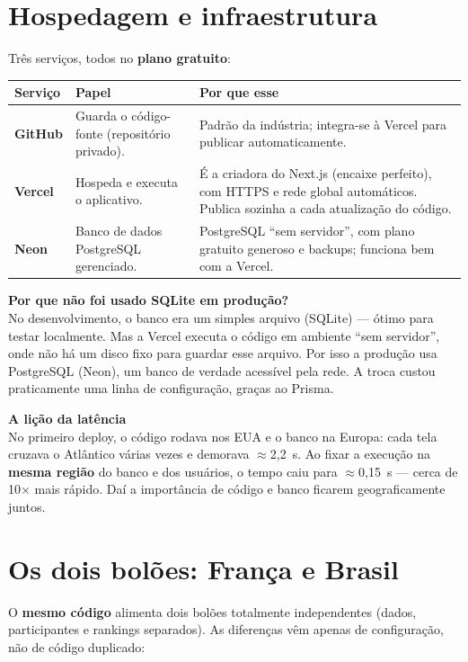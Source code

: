 \documentclass[11pt,a4paper]{article}
\newcommand{\caixa}[2]{%
  \par\medskip\noindent
  \colorbox{verdeclaro}{\begin{minipage}{\dimexpr\linewidth-2\fboxsep}
  \textbf{\color{verde}#1}\\[0.3em]#2
  \end{minipage}}\par\medskip}
\begin{document}
\section{Hospedagem e infraestrutura}\label{sec:hosting}

Três serviços, todos no \textbf{plano gratuito}:

\begin{center}
\begin{tabularx}{\textwidth}{@{}>{\bfseries}p{2.6cm} p{3.2cm} L@{}}
\toprule
Serviço & Papel & Por que esse \\
\midrule
GitHub & Guarda o código-fonte (repositório privado). & Padrão da indústria;
integra-se à Vercel para publicar automaticamente. \\[4pt]
Vercel & Hospeda e executa o aplicativo. & É a criadora do Next.js (encaixe
perfeito), com HTTPS e rede global automáticos. Publica sozinha a cada
atualização do código. \\[4pt]
Neon & Banco de dados PostgreSQL gerenciado. & PostgreSQL ``sem servidor'',
com plano gratuito generoso e backups; funciona bem com a Vercel. \\
\bottomrule
\end{tabularx}
\end{center}

\caixa{Por que não foi usado SQLite em produção?}{No desenvolvimento, o banco
era um simples arquivo (SQLite) --- ótimo para testar localmente. Mas a Vercel
executa o código em ambiente ``sem servidor'', onde não há um disco fixo para
guardar esse arquivo. Por isso a produção usa PostgreSQL (Neon), um banco de
verdade acessível pela rede. A troca custou praticamente uma linha de
configuração, graças ao Prisma.}

\caixa{A lição da latência}{No primeiro deploy, o código rodava nos EUA e o
banco na Europa: cada tela cruzava o Atlântico várias vezes e demorava
$\approx$2,2~s. Ao fixar a execução na \textbf{mesma região} do banco e dos
usuários, o tempo caiu para $\approx$0,15~s --- cerca de 10$\times$ mais rápido.
Daí a importância de código e banco ficarem geograficamente juntos.}

\section{Os dois bolões: França e Brasil}\label{sec:doisboloes}

O \textbf{mesmo código} alimenta dois bolões totalmente independentes (dados,
participantes e rankings separados). As diferenças vêm apenas de configuração,
não de código duplicado:
\end{document}
